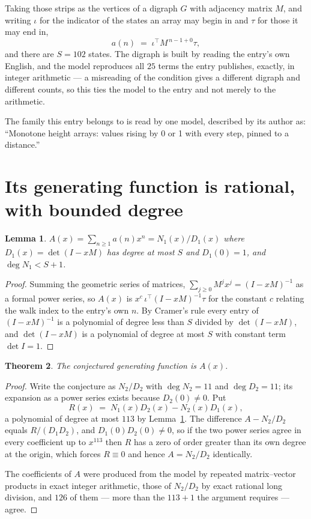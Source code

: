 \documentclass[11pt,a4paper]{article}
\theoremstyle{plain}
\newtheorem{theorem}{Theorem}
\newtheorem{lemma}[theorem]{Lemma}
\theoremstyle{definition}
\begin{document}
Taking those strips as the vertices of a digraph $G$ with adjacency matrix $M$, and writing
$\iota$ for the indicator of the states an array may begin in and $\tau$ for those it may end
in,
\[
a(n)\;=\;\iota^{\!\top}M^{\,n-1+0}\tau ,
\]
and there are $S=102$ states. The digraph is built by reading the entry's own English, and the
model reproduces all $25$ terms the entry publishes, exactly, in integer arithmetic --- a
misreading of the condition gives a different digraph and different counts, so this ties the
model to the entry and not merely to the arithmetic.

The family this entry belongs to is read by one model, described by its author as: ``Monotone height arrays: values rising by 0 or 1 with every step, pinned to a distance.''


\section{Its generating function is rational, with bounded degree}

\begin{lemma}\label{lem:rat}
$A(x)=\sum_{n\ge1}a(n)x^n=N_1(x)/D_1(x)$ where $D_1(x)=\det(I-xM)$ has degree at most
$S$ and $D_1(0)=1$, and $\deg N_1<S+1$.
\end{lemma}

\begin{proof}
Summing the geometric series of matrices, $\sum_{j\ge0}M^jx^j=(I-xM)^{-1}$ as a formal
power series, so $A(x)$ is $x^{c}\,\iota^{\!\top}(I-xM)^{-1}\tau$ for the constant $c$
relating the walk index to the entry's own $n$. By Cramer's rule every entry of
$(I-xM)^{-1}$ is a polynomial of degree less than $S$ divided by $\det(I-xM)$, and
$\det(I-xM)$ is a polynomial of degree at most $S$ with constant term $\det I=1$.
\end{proof}

\begin{theorem}
The conjectured generating function is $A(x)$.
\end{theorem}

\begin{proof}
Write the conjecture as $N_2/D_2$ with $\deg N_2=11$ and $\deg D_2=11$; its expansion as a
power series exists because $D_2(0)\neq0$. Put
\[
R(x)\;=\;N_1(x)D_2(x)-N_2(x)D_1(x),
\]
a polynomial of degree at most $113$ by Lemma~\ref{lem:rat}. The difference
$A-N_2/D_2$ equals $R/(D_1D_2)$, and $D_1(0)D_2(0)\neq0$, so if the two power series agree in
every coefficient up to $x^{113}$ then $R$ has a zero of order greater than its own
degree at the origin, which forces $R\equiv0$ and hence $A=N_2/D_2$ identically.

The coefficients of $A$ were produced from the model by repeated matrix--vector products in
exact integer arithmetic, those of $N_2/D_2$ by exact rational long division, and $126$
of them --- more than the $113+1$ the argument requires --- agree.
\end{proof}
\end{document}
